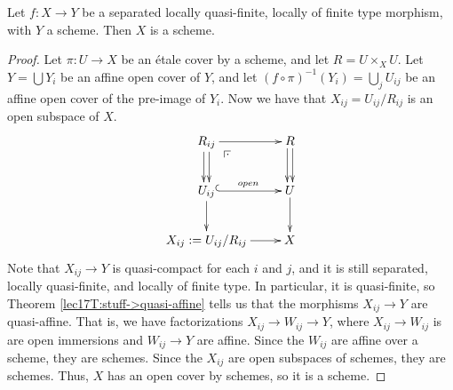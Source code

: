  \begin{corollary}\label{lec16C:sep,lqfin,lfp_over_scheme=scheme}
   Let $f:X\to Y$ be a separated locally quasi-finite, locally of finite type
   morphism, with $Y$ a scheme. Then $X$ is a scheme.
 \end{corollary}
 \begin{proof}
   Let $\pi:U\to X$ be an \'etale cover by a scheme, and let $R=U\times_X U$. Let
   $Y=\bigcup Y_i$ be an affine open cover of $Y$, and let $(f\circ
   \pi)^{-1}(Y_i)=\bigcup_j U_{ij}$ be an affine open cover of the pre-image of $Y_i$.
   Now we have that $X_{ij}=U_{ij}/R_{ij}$ is an open subspace of $X$.
   \[\xymatrix{
     R_{ij} \ar@<.5ex>[d]\ar@<-.5ex>[d] \ar[r]\ar@{}[dr]|(.25)\pb
        & R \ar@<.5ex>[d]\ar@<-.5ex>[d]\\
     U_{ij}\ar@{^(->}[r]^{open}\ar[d] & U\ar[d]\\
     X_{ij}:=U_{ij}/R_{ij} \ar[r] & X
   }\]
    Note that $X_{ij}\to Y$ is quasi-compact for each $i$ and $j$, and it is still
   separated, locally quasi-finite, and locally of finite type. In particular, it is
   quasi-finite, so Theorem \ref{lec17T:stuff->quasi-affine} tells us that the morphisms
   $X_{ij}\to Y$ are quasi-affine. That is, we have factorizations $X_{ij}\to W_{ij}\to
   Y$, where $X_{ij}\to W_{ij}$ is are open immersions and $W_{ij}\to Y$ are affine.
   Since the $W_{ij}$ are affine over a scheme, they are schemes. Since the $X_{ij}$ are
   open subspaces of schemes, they are schemes. Thus, $X$ has an open cover by schemes,
   so it is a scheme.
%
 \end{proof}
